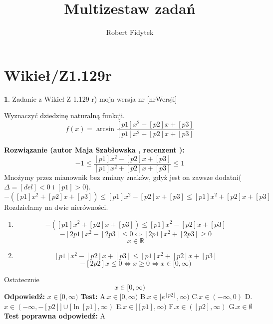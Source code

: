 \documentclass[12pt, a4paper]{article}
\title{Multizestaw zadań}
\author{Robert Fidytek}
\date{}
\theoremstyle{definition} %
\newtheorem{zad}{}
\newcommand{\kategoria}[1]{\section{#1}} %
\newcommand{\zadStart}[1]{\begin{zad}#1\newline} %
\newcommand{\zadStop}{\end{zad}}   %
\newcommand{\rozwStart}[2]{\noindent \textbf{Rozwiązanie (autor #1 , recenzent #2): }\newline} %
\newcommand{\rozwStop}{\newline}                                            %
\newcommand{\odpStart}{\noindent \textbf{Odpowiedź:}\newline}    %
\newcommand{\odpStop}{\newline}                                             %
\newcommand{\testStart}{\noindent \textbf{Test:}\newline} %
\newcommand{\testStop}{\newline} %
\newcommand{\kluczStart}{\noindent \textbf{Test poprawna odpowiedź:}\newline} %
\newcommand{\kluczStop}{\newline} %
\begin{document}
\maketitle


\kategoria{Wikieł/Z1.129r}
\zadStart{Zadanie z Wikieł Z 1.129 r) moja wersja nr [nrWersji]}



Wyznaczyć dziedzinę naturalną funkcji.
$$f(x)=\arcsin\frac{[p1]x^{2}-[p2]x+[p3]}{[p1]x^{2}+[p2]x+[p3]}$$
\zadStop

\rozwStart{Maja Szabłowska}{}
$$-1\leq\frac{[p1]x^{2}-[p2]x+[p3]}{[p1]x^{2}+[p2]x+[p3]}\leq 1$$
Mnożymy przez mianownik bez zmiany znaków, gdyż jest on zawsze dodatni($\Delta=[del]<0$ i $[p1]>0$).
$$-([p1]x^{2}+[p2]x+[p3])\leq[p1]x^{2}-[p2]x+[p3]\leq[p1]x^{2}+[p2]x+[p3]$$
Rozdzielamy na dwie nierówności.
\begin{enumerate}
    \item $$-([p1]x^{2}+[p2]x+[p3])\leq[p1]x^{2}-[p2]x+[p3]$$
$$-[2p1]x^{2}-[2p3]\leq 0 \iff [2p1]x^{2}+[2p3]\geq0$$
$$ x \in \mathbb{R}$$
\item $$[p1]x^{2}-[p2]x+[p3]\leq[p1]x^{2}+[p2]x+[p3]$$
$$-[2p2]x\leq0 \iff x\geq0 \iff x\in[0,\infty)$$

\end{enumerate}
Ostatecznie 
$$x\in[0,\infty)$$
\rozwStop
\odpStart
$x\in[0,\infty)$
\odpStop
\testStart
A.$x\in[0,\infty)$
B.$x\in[e^{[p2]},\infty)$
C.$x\in(-\infty, 0)$
D.$x\in(-\infty, -[p2]] \cup [\ln[p1],\infty)$
E.$x\in[[p1],\infty)$
F.$x\in([p2],\infty)$
G.$x\in\emptyset$
\testStop
\kluczStart
A
\kluczStop
\end{document}
